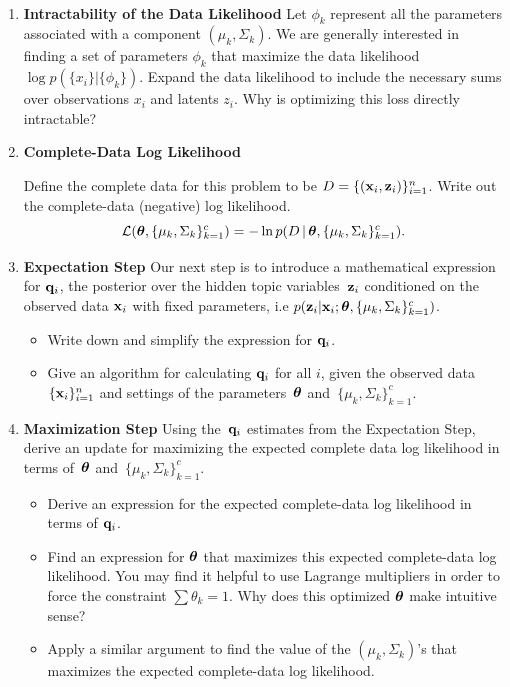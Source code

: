 \documentclass[submit]{harvardml}
\begin{document}
\begin{problem}
      ~

  \begin{enumerate}

  \item \textbf{Intractability of the Data Likelihood}
     Let $\phi_k$ represent all the parameters associated with a component $(\mu_k,\Sigma_k)$.  We
     are generally interested in finding a set of parameters $\phi_k$ that maximize the data
     likelihood $\log p(\{x_i\}|\{\phi_k\})$.  Expand the data likelihood to include the %
    necessary sums over observations $x_i$ and latents $z_i$.  Why is optimizing this loss directly
    intractable?
    
\item \textbf{Complete-Data Log Likelihood} 

    Define the complete data for this problem to be $D =
    \{(\mathbf{x}_i, \mathbf{z}_i)\}_{i=1}^n$. Write out the complete-data (negative) log likelihood.
    \[\mathcal{L}(\boldsymbol{\theta}, \{\mu_k,\Sigma_k\}^c_{k=1}) =  -\ln p(D \,|\,\boldsymbol{\theta},
    \{\mu_k,\Sigma_k\}^c_{k=1}).\] 


\item \textbf{Expectation Step}
Our next step is to introduce a mathematical expression for $\mathbf{q}_i$, the posterior over the hidden topic variables~$\mathbf{z}_i$ conditioned on the observed data $\mathbf{x}_i$ with fixed parameters, i.e $p(\mathbf{z}_i | \mathbf{x}_i; \boldsymbol{\theta}, \{ \mu_k,\Sigma_k \}^c_{k=1})$.

\begin{itemize}
\item  Write down and simplify the expression for $\mathbf{q}_i$. 
\item  Give an algorithm for calculating $\mathbf{q}_i$ for all $i$, given the observed data~$\{\mathbf{x}_i\}^n_{i=1}$ and settings of the parameters~$\boldsymbol{\theta}$ and~$\{ \mu_k,\Sigma_k  \}^c_{k=1}$.

\end{itemize}

\item \textbf{Maximization Step}
Using the~$\mathbf{q}_i$ estimates from the Expectation Step, derive an update for maximizing the expected complete data log likelihood in terms of~$\boldsymbol{\theta}$ and~$\{ \mu_k,\Sigma_k \}^c_{k=1}$.

\begin{itemize}
    \item Derive an expression for the expected complete-data log likelihood in terms of $\mathbf{q}_i$.
    \item Find an expression for $\boldsymbol{\theta}$ that maximizes this expected complete-data log likelihood. You may find it helpful to use Lagrange multipliers in order to force the constraint $\sum \theta_k = 1$. Why does this optimized $\boldsymbol{\theta}$ make intuitive sense?
    \item Apply a similar argument to find the value of the $(\mu_k,\Sigma_k)$'s that maximizes the expected complete-data log likelihood. 
\end{itemize}


\end{enumerate}
\end{problem}
\end{document}
